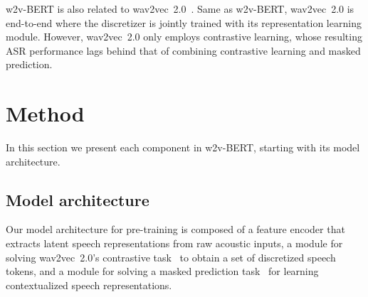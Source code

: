 \documentclass{article}
\begin{document}
w2v-BERT is also related to wav2vec~2.0~\cite{baevski2020wav2vec}.
Same as w2v-BERT, wav2vec~2.0 is end-to-end where the discretizer is jointly trained with its representation learning module.
However, wav2vec~2.0 only employs contrastive learning, whose resulting ASR performance lags behind that of combining contrastive learning and masked prediction.


\section{Method}
\label{sec:method}
In this section we present each component in w2v-BERT, starting with its model architecture.

\subsection{Model architecture}

\begin{table}[htbp]
  \caption{Parameters for w2v-BERT models. Dim. stands for dimension.}
  \vskip 0.1in
  \label{tab:model_params}
  \centering
\end{table}
Our model architecture for pre-training is composed of a feature encoder that extracts latent speech representations from raw acoustic inputs, a module for solving wav2vec~2.0's contrastive task~\cite{baevski2020wav2vec} to obtain a set of discretized speech tokens, and a module for solving a masked prediction task~\cite{devlin2019bert} for learning contextualized speech representations.
\end{document}
